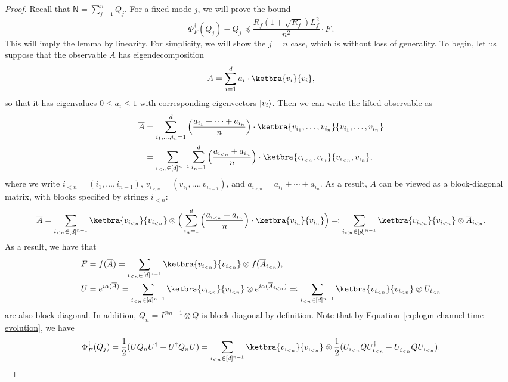 \documentclass[10pt]{article}
\DeclarePairedDelimiter{\ket}{\lvert}{\rangle}%
\newcommand{\luders}{\Phi}
\newcommand{\lift}[1]{\overline{#1}}
\begin{document}
\begin{proof}
Recall that $\mathsf{N} = \sum^n_{j=1} Q_j$.
    For a fixed mode $j$, we will prove the bound
    \begin{equation}\label{eq:goal-bound}
        \luders^\dagger_F(Q_j) - Q_j \preceq \frac{ R_f (1 + \sqrt{R_f})L^2_f}{n^2} \cdot F\,.
    \end{equation}
    This will imply the lemma by linearity. 
    For simplicity, we will show the $j = n$ case, which is without loss of generality.
    To begin, let us suppose that the observable $A$ has eigendecomposition
    \begin{equation*}
        A = \sum_{i=1}^d a_i \cdot \ketbra{v_i}{v_i},
    \end{equation*}
    so that it has eigenvalues $0 \leq a_i \leq 1$ with corresponding eigenvectors $\ket{v_i}$.
    Then we can write the lifted observable as
    \begin{align*}
        \lift{A}
        &= \sum_{i_1, \ldots, i_n = 1}^d \Big(\frac{a_{i_1} + \cdots + a_{i_n}}{n}\Big)\cdot \ketbra{v_{i_1}, \ldots, v_{i_n}}{v_{i_1}, \ldots, v_{i_n}}\\
        &= \sum_{i_{< n} \in [d]^{n-1}}\sum_{i_n=1}^d \Big(\frac{a_{i_{<n}} + a_{i_n}}{n}\Big)\cdot \ketbra{v_{i_{<n}}, v_{i_n}}{v_{i_{<n}}, v_{i_n}},
    \end{align*}
    where we write $i_{< n} = (i_1, \ldots, i_{n-1})$, $v_{i_{<n}} = (v_{i_1}, \ldots, v_{i_{n-1}})$, and $a_{i_{< n}} = a_{i_1} + \cdots +  a_{i_n}$.
    As a result, $\lift{A}$ can be viewed as a block-diagonal matrix, with blocks specified by strings $i_{<n}$:
    \begin{equation*}
        \lift{A}
         = \sum_{i_{< n} \in [d]^{n-1}}\ketbra{v_{i_{<n}}}{v_{i_{<n}}} \otimes \Big(\sum_{i_n=1}^d \Big(\frac{a_{i_{<n}} + a_{i_n}}{n}\Big)\cdot \ketbra{v_{i_n}}{v_{i_n}}\Big)
         \eqqcolon\sum_{i_{< n} \in [d]^{n-1}}\ketbra{v_{i_{<n}}}{v_{i_{<n}}} \otimes \lift{A}_{i_{<n}}.
    \end{equation*}
    As a result, we have that
    \begin{align*}
        F
        &= f(\lift{A})
        = \sum_{i_{< n} \in [d]^{n-1}}\ketbra{v_{i_{<n}}}{v_{i_{<n}}} \otimes f(\lift{A}_{i_{<n}}),\\
        U
        &= e^{i\alpha(\lift{A})}
        = \sum_{i_{< n} \in [d]^{n-1}}\ketbra{v_{i_{<n}}}{v_{i_{<n}}} \otimes e^{i \alpha(\lift{A}_{i_{<n}})}
        \eqqcolon \sum_{i_{< n} \in [d]^{n-1}}\ketbra{v_{i_{<n}}}{v_{i_{<n}}} \otimes U_{i_{<n}}
    \end{align*}
    are also block diagonal.
    In addition, $Q_n = I^{\otimes n-1} \otimes Q$ is block diagonal by definition.
    Note that by Equation~\eqref{eq:logm-channel-time-evolution}, we have
    \begin{equation}\label{eq:blog-diag}
        \luders^\dagger_F(Q_j) = \frac{1}{2}(UQ_nU^\dagger + U^\dagger Q_n U)
        = \sum_{i_{<n} \in [d]^{n-1}} \ketbra{v_{i_{<n}}}{v_{i_{<n}}} \otimes \frac{1}{2}(U_{i_{<n}} Q U_{i_{<n}} ^\dagger + U_{i_{<n}} ^\dagger Q U_{i_{<n}} ).
    \end{equation}


\end{proof}
\end{document}
